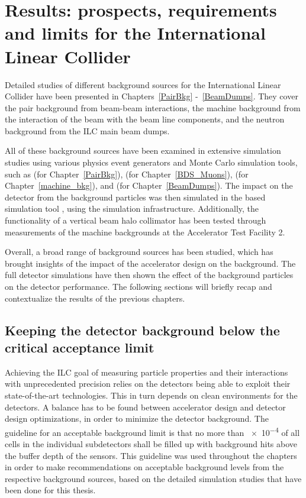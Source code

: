 \chapter{Results: prospects, requirements and limits for the International Linear Collider}
\label{Results}
Detailed studies of different background sources for the International Linear Collider have been presented in Chapters~\ref{PairBkg} -~\ref{BeamDumps}.
They cover the \positron\electron pair background from beam-beam interactions, the machine background from the interaction of the beam with the beam line components, and the neutron background from the ILC main beam dumps.

All of these background sources have been examined in extensive simulation studies using various physics event generators and Monte Carlo simulation tools, such as \guineapig (for Chapter~\ref{PairBkg}), \mucarlo (for Chapter~\ref{BDS_Muons}), \bdsim (for Chapter~\ref{machine_bkg}), and \fluka (for Chapter~\ref{BeamDumps}).
The impact on the \sid detector from the background particles was then simulated in the \geant based simulation tool \slic, using the \sid simulation infrastructure.
Additionally, the functionality of a vertical beam halo collimator has been tested through measurements of the machine backgrounds at the Accelerator Test Facility 2.

Overall, a broad range of background sources has been studied, which has brought insights of the impact of the accelerator design on the background.
The full detector simulations have then shown the effect of the background particles on the \sid detector performance.
The following sections will briefly recap and contextualize the results of the previous chapters.

\section{Keeping the detector background below the critical acceptance limit}
Achieving the ILC goal of measuring particle properties and their interactions with unprecedented precision relies on the detectors being able to exploit their state-of-the-art technologies.
This in turn depends on clean environments for the detectors.
A balance has to be found between accelerator design and detector design optimizations, in order to minimize the detector background.
The \sid guideline for an acceptable background limit is that no more than \num{e-4} of all cells in the individual subdetectors shall be filled up with background hits above the buffer depth of the sensors.
This guideline was used throughout the chapters in order to make recommendations on acceptable background levels from the respective background sources, based on the detailed simulation studies that have been done for this thesis.

